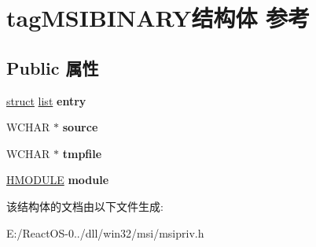 \hypertarget{structtag_m_s_i_b_i_n_a_r_y}{}\section{tag\+M\+S\+I\+B\+I\+N\+A\+R\+Y结构体 参考}
\label{structtag_m_s_i_b_i_n_a_r_y}
\subsection*{Public 属性}
\begin{DoxyCompactItemize}
\item 
\mbox{\label{structtag_m_s_i_b_i_n_a_r_y_aee422c45a991630165bf153fc9829233}} 
\hyperlink{interfacestruct}{struct} \hyperlink{classlist}{list} {\bfseries entry}
\item 
\mbox{\label{structtag_m_s_i_b_i_n_a_r_y_a5050342d449ec965c85d6951f5684751}} 
W\+C\+H\+AR $\ast$ {\bfseries source}
\item 
\mbox{\label{structtag_m_s_i_b_i_n_a_r_y_a8a9f69d0b617528ee823cef3a25830f2}} 
W\+C\+H\+AR $\ast$ {\bfseries tmpfile}
\item 
\mbox{\label{structtag_m_s_i_b_i_n_a_r_y_ae551115496f384abcc1d8284c27137d6}} 
\hyperlink{interfacevoid}{H\+M\+O\+D\+U\+LE} {\bfseries module}
\end{DoxyCompactItemize}


该结构体的文档由以下文件生成\+:\begin{DoxyCompactItemize}
\item 
E\+:/\+React\+O\+S-\/0../dll/win32/msi/msipriv.\+h\end{DoxyCompactItemize}
